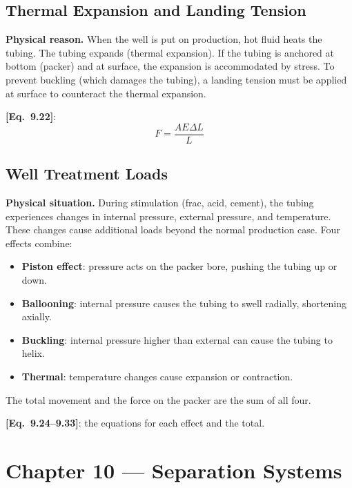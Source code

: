 \documentclass[11pt,a4paper,openany]{book}
\newcommand{\eqrefbook}[1]{\textcolor{blue!60!black}{\textbf{[Eq.~#1]}}}
\begin{document}
\section{Thermal Expansion and Landing Tension}

\begin{theory}
\textbf{Physical reason.} When the well is put on production, hot
fluid heats the tubing. The tubing expands (thermal expansion). If
the tubing is anchored at bottom (packer) and at surface, the
expansion is accommodated by stress. To prevent buckling (which
damages the tubing), a landing tension must be applied at surface to
counteract the thermal expansion.
\end{theory}

\eqrefbook{9.22}:
\begin{equation}
  F = \frac{AE\Delta L}{L}
\end{equation}

\section{Well Treatment Loads}

\begin{theory}
\textbf{Physical situation.} During stimulation (frac, acid, cement),
the tubing experiences changes in internal pressure, external
pressure, and temperature. These changes cause additional loads
beyond the normal production case. Four effects combine:
\begin{itemize}
  \item \textbf{Piston effect}: pressure acts on the packer bore,
        pushing the tubing up or down.
  \item \textbf{Ballooning}: internal pressure causes the tubing to
        swell radially, shortening axially.
  \item \textbf{Buckling}: internal pressure higher than external
        can cause the tubing to helix.
  \item \textbf{Thermal}: temperature changes cause expansion or
        contraction.
\end{itemize}

The total movement and the force on the packer are the sum of all four.
\end{theory}

\eqrefbook{9.24--9.33}: the equations for each effect and the total.

\chapter{Chapter 10 — Separation Systems}
\end{document}

